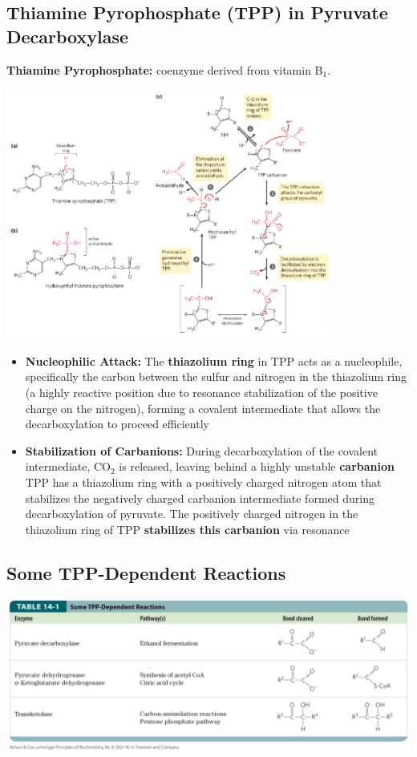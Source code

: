 \documentclass[10pt]{article}
\begin{document}
\subsection*{Thiamine Pyrophosphate (TPP) in Pyruvate Decarboxylase}
\textbf{Thiamine Pyrophosphate:} coenzyme derived from vitamin B$_1$.
\begin{center} 
	\includegraphics*[width=0.8\textwidth]{L2_15.png}
\end{center}
\begin{itemize}
	\item \textbf{Nucleophilic Attack:} The \textbf{thiazolium ring} in TPP acts as a nucleophile, specifically the carbon between the sulfur and nitrogen in the thiazolium ring (a highly reactive position due to resonance stabilization of the positive charge on the nitrogen), forming a covalent intermediate that allows the decarboxylation to proceed efficiently
	\item \textbf{Stabilization of Carbanions:} During decarboxylation of the covalent intermediate, CO$_2$ is released, leaving behind a highly unstable \textbf{carbanion} TPP has a thiazolium ring with a positively charged nitrogen atom that stabilizes the negatively charged carbanion intermediate formed during decarboxylation of pyruvate. The positively charged nitrogen in the thiazolium ring of TPP \textbf{stabilizes this carbanion} via resonance
\end{itemize}

\subsection*{Some TPP-Dependent Reactions}
\begin{center} 
	\includegraphics*[width=\textwidth]{L2_16.png}
\end{center}
\end{document}
